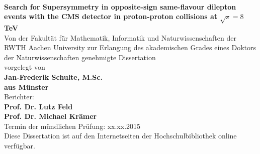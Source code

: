 \thispagestyle{empty}
\begin{center}
  ~ \\
  \vspace{-0.5cm}
 {\huge\bf{Search for Supersymmetry in opposite-sign same-flavour dilepton events with the CMS detector in proton-proton collisions at $\sqrt{s}=8$ TeV}\\}
  \vspace{2.5cm}
    { Von der Fakult\"at f\"ur Mathematik, Informatik und Naturwissenschaften der
RWTH Aachen University zur Erlangung des akademischen Grades
eines Doktors der Naturwissenschaften genehmigte Dissertation\\}
  \vspace{2.5cm}
    {\Large vorgelegt von}\\
    {\Large\bf Jan-Frederik Schulte, M.Sc.}\\
    {\Large\bf aus M\"unster } \\
    
  \vspace{3.cm}
    {\large Berichter: }\\
  	{\Large\bf Prof. Dr. Lutz Feld}\\
  	{\Large\bf Prof. Dr. Michael Kr\"amer}\\
  	
  \vspace{2.cm}
  {\Large Termin der m\"undlichen Pr\"ufung: xx.xx.2015\\}
  \vspace{2cm}
  {\Large Diese Dissertation ist auf den Internetseiten der Hochschulbibliothek online verf\"ugbar.}	
\end{center}
\cleardoublepage
\newpage
\newpage
